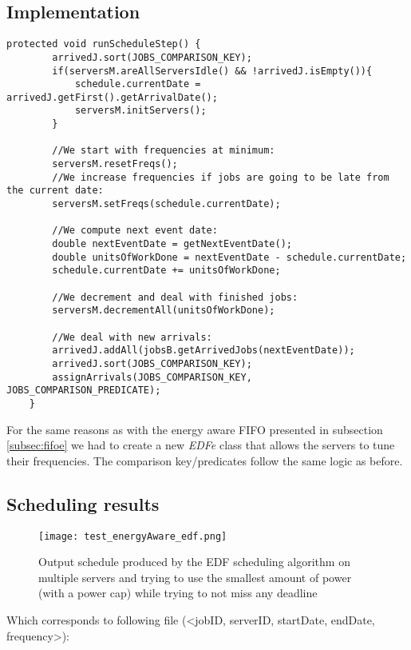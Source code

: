 \documentclass[./report.tex]{subfiles}
\begin{document}
\subsection{Implementation}

\begin{lstlisting}[style=Java, caption={Source code of an energy aware EDF adapted for multiple servers}]
	protected void runScheduleStep() {
		arrivedJ.sort(JOBS_COMPARISON_KEY);
		if(serversM.areAllServersIdle() && !arrivedJ.isEmpty()){
			schedule.currentDate = arrivedJ.getFirst().getArrivalDate();
			serversM.initServers();
		}
		
		//We start with frequencies at minimum:
		serversM.resetFreqs();
		//We increase frequencies if jobs are going to be late from the current date:
		serversM.setFreqs(schedule.currentDate);
		
		//We compute next event date:
		double nextEventDate = getNextEventDate();
		double unitsOfWorkDone = nextEventDate - schedule.currentDate;
		schedule.currentDate += unitsOfWorkDone;
		
		//We decrement and deal with finished jobs:
		serversM.decrementAll(unitsOfWorkDone);
		
		//We deal with new arrivals:
		arrivedJ.addAll(jobsB.getArrivedJobs(nextEventDate));
		arrivedJ.sort(JOBS_COMPARISON_KEY);
		assignArrivals(JOBS_COMPARISON_KEY, JOBS_COMPARISON_PREDICATE);
	}
\end{lstlisting}

For the same reasons as with the energy aware FIFO presented in subsection \ref{subsec:fifoe} we had to create a new \textit{EDFe} class that allows the servers to tune their frequencies. The comparison key/predicates follow the same logic as before.

\newpage
\subsection{Scheduling results}
\begin{figure}[!h]
	\center
	\texttt{[image: test\_energyAware\_edf.png]}
	\caption{Output schedule produced by the EDF scheduling algorithm on multiple servers and trying to use the smallest amount of power (with a power cap) while trying to not miss any deadline}
	\label{fig:energyAware_edf} 
\end{figure}

Which corresponds to following file (<jobID, serverID, startDate, endDate, frequency>):

\end{document}
